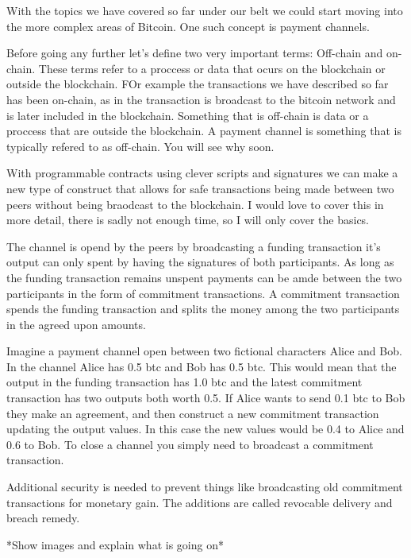 With the topics we have covered so far under our belt we could start moving into
the more complex areas of Bitcoin. One such concept is payment channels. 

Before going any further let's define two very important terms: Off-chain and on-chain.
These terms refer to a proccess or data that ocurs on the blockchain or outside the blockchain.
FOr example the transactions we have described so far has been on-chain, as in the 
transaction is broadcast to the bitcoin network and is later included in the blockchain.
Something that is off-chain is data or a proccess that are outside the blockchain.
A payment channel is something that is typically refered to as off-chain. You will see
why soon.

With programmable contracts using clever scripts and signatures we can make a new type
of construct that allows for safe transactions being made between two peers without
being braodcast to the blockchain. I would love to cover this in more detail, there is
sadly not enough time, so I will only cover the basics.

The channel is opend by the peers by broadcasting a funding transaction it's 
output can only spent by having the signatures of both participants. As long
as the funding transaction remains unspent payments can be amde between the
two participants in the form of commitment transactions. A commitment transaction
spends the funding transaction and splits the money among the two participants 
in the agreed upon amounts. 

Imagine a payment channel open between two fictional characters Alice and Bob.
In the channel Alice has 0.5 btc and Bob has 0.5 btc. This would mean that the output
in the funding transaction has 1.0 btc and the latest commitment transaction has two 
outputs both worth 0.5. If Alice wants to send 0.1 btc to Bob they make an agreement,
and then construct a new commitment transaction updating the output values. In this
case the new values would be 0.4 to Alice and 0.6 to Bob. To close a channel you
simply need to broadcast a commitment transaction. 

Additional security is needed to prevent things like broadcasting old commitment 
transactions for monetary gain. The additions are called revocable delivery and breach
remedy. 

*Show images and explain what is going on*
